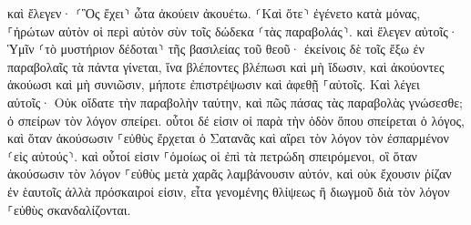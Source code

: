 \documentclass{openreader}
\begin{document}
καὶ ἔλεγεν· ⸂Ὃς ἔχει⸃ ὦτα ἀκούειν ἀκουέτω. 
⸂Καὶ ὅτε⸃ ἐγένετο κατὰ μόνας, ⸀ἠρώτων αὐτὸν οἱ περὶ αὐτὸν σὺν τοῖς δώδεκα ⸂τὰς παραβολάς⸃. 
καὶ ἔλεγεν αὐτοῖς· Ὑμῖν ⸂τὸ μυστήριον δέδοται⸃ τῆς βασιλείας τοῦ θεοῦ· ἐκείνοις δὲ τοῖς ἔξω ἐν παραβολαῖς τὰ πάντα γίνεται, 
ἵνα βλέποντες βλέπωσι καὶ μὴ ἴδωσιν, καὶ ἀκούοντες ἀκούωσι καὶ μὴ συνιῶσιν, μήποτε ἐπιστρέψωσιν καὶ ἀφεθῇ ⸀αὐτοῖς. 
Καὶ λέγει αὐτοῖς· Οὐκ οἴδατε τὴν παραβολὴν ταύτην, καὶ πῶς πάσας τὰς παραβολὰς γνώσεσθε; 
ὁ σπείρων τὸν λόγον σπείρει. 
οὗτοι δέ εἰσιν οἱ παρὰ τὴν ὁδὸν ὅπου σπείρεται ὁ λόγος, καὶ ὅταν ἀκούσωσιν ⸀εὐθὺς ἔρχεται ὁ Σατανᾶς καὶ αἴρει τὸν λόγον τὸν ἐσπαρμένον ⸂εἰς αὐτούς⸃. 
καὶ οὗτοί εἰσιν ⸀ὁμοίως οἱ ἐπὶ τὰ πετρώδη σπειρόμενοι, οἳ ὅταν ἀκούσωσιν τὸν λόγον ⸀εὐθὺς μετὰ χαρᾶς λαμβάνουσιν αὐτόν, 
καὶ οὐκ ἔχουσιν ῥίζαν ἐν ἑαυτοῖς ἀλλὰ πρόσκαιροί εἰσιν, εἶτα γενομένης θλίψεως ἢ διωγμοῦ διὰ τὸν λόγον ⸀εὐθὺς σκανδαλίζονται. 
\end{document}
